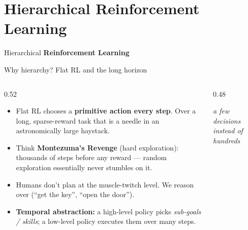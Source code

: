 \section{Hierarchical Reinforcement Learning}

\begin{frame}{}
    \LARGE Hierarchical \textbf{Reinforcement Learning}
\end{frame}

\begin{frame}{Why hierarchy? Flat RL and the long horizon}
\begin{columns}[c]
\begin{column}{0.52\textwidth}
\begin{itemize}\footnotesize\itemsep0.5em
    \item Flat RL chooses a \textbf{primitive action every step}. Over a long,
          sparse-reward task that is a needle in an astronomically large haystack.
    \item Think \textbf{Montezuma's Revenge} (hard exploration): thousands of steps before any
          reward --- random exploration essentially never stumbles on it.
    \item Humans don't plan at the muscle-twitch level. We reason over 
          (``get the key'', ``open the door'').
    \item \textbf{Temporal abstraction:} a high-level policy picks \emph{sub-goals /
          skills}; a low-level policy executes them over many steps.
\end{itemize}
\end{column}
\begin{column}{0.48\textwidth}
\centering
{}
\vspace{0.5em}

{\footnotesize\itshape a few decisions instead of hundreds}
\end{column}
\end{columns}
\end{frame}

